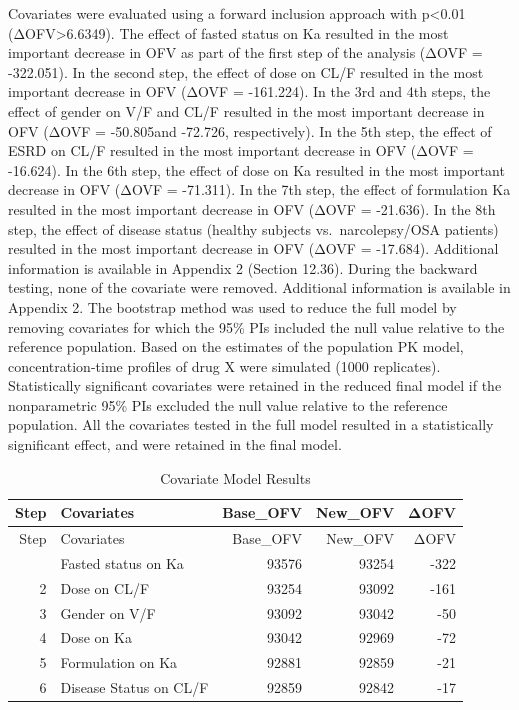 \documentclass[
  letterpaper,
  toc=chapterentrywithdots,
  11pt,
  headings=small]{scrreprt}
\begin{document}
Covariates were evaluated using a forward inclusion approach with
p\textless0.01 (ΔOFV\textgreater6.6349). The effect of fasted status on
Ka resulted in the most important decrease in OFV as part of the first
step of the analysis (ΔOVF = -322.051). In the second step, the effect
of dose on CL/F resulted in the most important decrease in OFV (ΔOVF =
-161.224). In the 3rd and 4th steps, the effect of gender on V/F and
CL/F resulted in the most important decrease in OFV (ΔOVF = -50.805and
-72.726, respectively). In the 5th step, the effect of ESRD on CL/F
resulted in the most important decrease in OFV (ΔOVF = -16.624). In the
6th step, the effect of dose on Ka resulted in the most important
decrease in OFV (ΔOVF = -71.311). In the 7th step, the effect of
formulation Ka resulted in the most important decrease in OFV (ΔOVF =
-21.636). In the 8th step, the effect of disease status (healthy
subjects vs.~narcolepsy/OSA patients) resulted in the most important
decrease in OFV (ΔOVF = -17.684). Additional information is available in
Appendix 2 (Section 12.36). During the backward testing, none of the
covariate were removed. Additional information is available in Appendix
2. The bootstrap method was used to reduce the full model by removing
covariates for which the 95\% PIs included the null value relative to
the reference population. Based on the estimates of the population PK
model, concentration-time profiles of drug X were simulated (1000
replicates). Statistically significant covariates were retained in the
reduced final model if the nonparametric 95\% PIs excluded the null
value relative to the reference population. All the covariates tested in
the full model resulted in a statistically significant effect, and were
retained in the final model.

\begin{longtable}[]{@{}rlrrr@{}}
\caption{Covariate Model Results}\tabularnewline
\toprule\noalign{}
Step & Covariates & Base\_OFV & New\_OFV & ΔOFV \\
\midrule\noalign{}
\endfirsthead
\toprule\noalign{}
Step & Covariates & Base\_OFV & New\_OFV & ΔOFV \\
\midrule\noalign{}
\endhead
\bottomrule\noalign{}
\endlastfoot
1 & Fasted status on Ka & 93576 & 93254 & -322 \\
2 & Dose on CL/F & 93254 & 93092 & -161 \\
3 & Gender on V/F & 93092 & 93042 & -50 \\
4 & Dose on Ka & 93042 & 92969 & -72 \\
5 & Formulation on Ka & 92881 & 92859 & -21 \\
6 & Disease Status on CL/F & 92859 & 92842 & -17 \\
\end{longtable}
\end{document}
